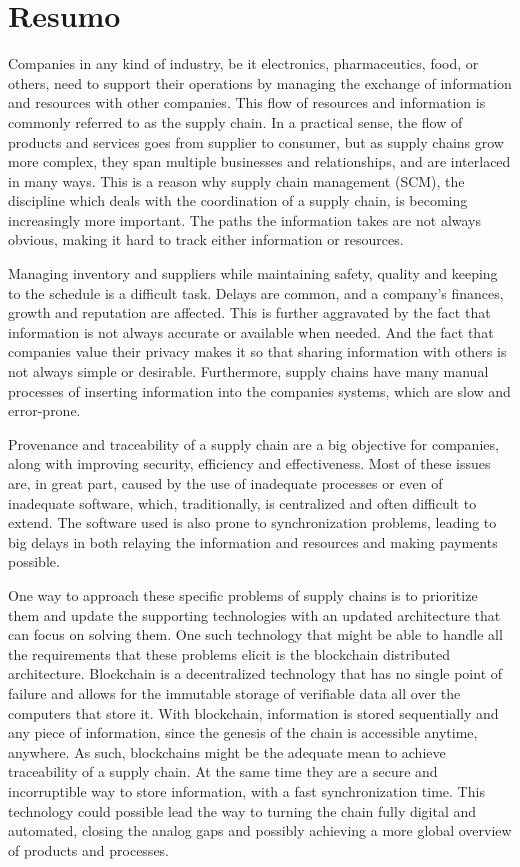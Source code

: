 \chapter{Resumo}
Companies in any kind of industry, be it electronics, pharmaceutics, food, or others, need to support their operations by managing the exchange of information and resources with other companies. This flow of resources and information is commonly referred to as the supply chain. In a practical sense, the flow of products and services goes from supplier to consumer, but as supply chains grow more complex, they span multiple businesses and relationships, and are interlaced in many ways. This is a reason why supply chain management (SCM), the discipline which deals with the coordination of a supply chain, is becoming increasingly more important. The paths the information takes are not always obvious, making it hard to track either information or resources.


Managing inventory and suppliers while maintaining safety, quality and keeping to the schedule is a difficult task. Delays are common, and a company’s finances, growth and reputation are affected. This is further aggravated by the fact that information is not always accurate or available when needed. And the fact that companies value their privacy makes it so that sharing information with others is not always simple or desirable. Furthermore, supply chains have many manual processes of inserting information into the companies systems, which are slow and error-prone.

Provenance and traceability of a supply chain are a big objective for companies, along with improving security, efficiency and effectiveness. Most of these issues are, in great part, caused by the use of inadequate processes or even of inadequate software, which, traditionally, is centralized and often difficult to extend. The software used is also prone to synchronization problems, leading to big delays in both relaying the information and resources and making payments possible. 

One way to approach these specific problems of supply chains is to prioritize them and update the supporting technologies with an updated architecture that can focus on solving them. One such technology that might be able to handle all the requirements that these problems elicit is the blockchain distributed architecture. Blockchain is a decentralized technology that has no single point of failure and allows for the immutable storage of verifiable data all over the computers that store it. With blockchain, information is stored sequentially and any piece of information, since the genesis of the chain is accessible anytime, anywhere. As such, blockchains might be the adequate mean to achieve traceability of a supply chain. At the same time they are a secure and incorruptible way to store information, with a fast synchronization time. This technology could possible lead the way to turning the chain fully digital and automated, closing the analog gaps and possibly achieving a more global overview of products and processes.

